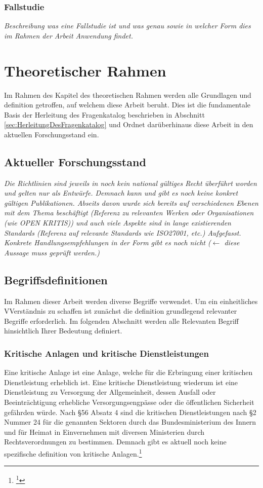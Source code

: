 \documentclass[11pt,a4paper,hidelinks]{article}   %
\begin{document}
            \subsubsection{Fallstudie}
                \emph{Beschreibung was eine Fallstudie ist und was genau sowie in welcher Form dies im Rahmen der Arbeit Anwendung findet.}

    
    \newpage
    \section{Theoretischer Rahmen}
        Im Rahmen des Kapitel des theoretischen Rahmen werden alle Grundlagen und definition getroffen, auf welchem diese Arbeit beruht. Dies ist die fundamentale Basis der Herleitung des Fragenkatalog beschrieben in Abschnitt \ref{sec:HerleitungDesFragenkatalog} und Ordnet darüberhinaus diese Arbeit in den aktuellen Forschungsstand ein.
        \subsection{Aktueller Forschungsstand}
            \emph{Die Richtlinien sind jeweils in noch kein national gültiges Recht überführt worden und gelten nur als Entwürfe. Demnach kann und gibt es noch keine konkret gültigen Publikationen. Abseits davon wurde sich bereits auf verschiedenen Ebenen mit dem Thema beschäftigt (Referenz zu relevanten Werken oder Organisationen (wie OPEN KRITIS)) und auch viele Aspekte sind in lange existierenden Standards (Referenz auf relevante Standards wie ISO27001, etc.) Aufgefasst. Konkrete Handlungsempfehlungen in der Form gibt es noch nicht ($\leftarrow$ diese Aussage muss geprüft werden.)}
        
        \subsection{Begriffsdefinitionen}
        Im Rahmen dieser Arbeit werden diverse Begriffe verwendet. Um ein einheitliches VVerständnis zu schaffen ist zunächst die definition grundlegend relevanter Begriffe erforderlich. Im folgenden Abschnitt werden alle Relevanten Begriff hinsichtlich Ihrer Bedeutung definiert.       
            \subsubsection{Kritische Anlagen und kritische Dienstleistungen}
            Eine kritische Anlage ist eine Anlage, welche für die Erbringung einer kritischen Dienstleistung erheblich ist. Eine kritische Dienstleistung wiederum ist eine Dienstleistung zu Versorgung der Allgemeinheit, dessen Ausfall oder Beeinträchtigung erhebliche Versorgungsengpässe oder die öffentlichen Sicherheit gefährden würde. Nach §56 Absatz 4 sind die kritischen Dienstleistungen nach §2 Nummer 24 für die genannten Sektoren durch das Bundesministerium des Innern und für Heimat in Einvernehmen mit diversen Ministerien durch Rechtsverordnungen zu bestimmen. Demnach gibt es aktuell noch keine spezifische definition von kritische Anlagen.\footnote{
                \footcite[§2 Nummer 22 und 24 sowie §56 Absatz 4][]{NIS2UmsuCG}
            }
\end{document}
